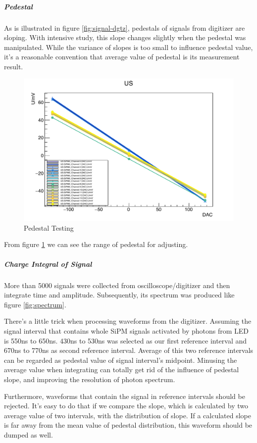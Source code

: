 \documentclass[11pt,a4paper]{article}
\begin{document}
\subparagraph{Pedestal}
As is illustrated in figure \ref{fig:signal-dgtz}, pedestals of signals from digitizer are sloping.
With intensive study, this slope changes slightly when the pedestal was manipulated.
While the variance of slopes is too small to influence pedestal value, it's a reasonable convention that average value of pedestal is its measurement result.

\begin{figure}[ht]
    \includegraphics[scale=0.5]{fig/Pedestal.pdf}
    \caption{Pedestal Testing}\label{fig:ped}
\end{figure}

From figure \ref{fig:ped} we can see the range of pedestal for adjusting.


\subparagraph{Charge Integral of Signal}

More than 5000 signals were collected from oscilloscope/digitizer and then integrate time and amplitude. Subsequently, its spectrum was produced like figure \ref{fig:spectrum}.

There's a little trick when processing waveforms from the digitizer.
Assuming the signal interval that contains whole SiPM signals activated by photons from LED is 550ns to 650ns.
430ns to 530ns was selected as our first reference interval and 670ns to 770ns as second reference interval.
Average of this two reference intervals can be regarded as pedestal value of signal interval's midpoint.
Minusing the average value when integrating can totally get rid of the influence of pedestal slope, and improving the resolution of photon spectrum.

Furthermore, waveforms that contain the signal in reference intervals should be rejected.
It's easy to do that if we compare the slope, which is calculated by two average value of two intervals, with the distribution of slope.
If a calculated slope is far away from the mean value of pedestal distribution, this waveform should be dumped as well.
    
\end{document}
